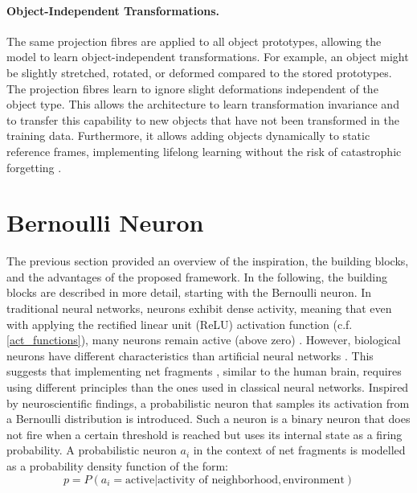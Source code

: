 \paragraph{Object-Independent Transformations.} The same projection fibres are applied to all object prototypes, allowing the model to learn object-independent transformations. For example, an object might be slightly stretched, rotated, or deformed compared to the stored prototypes. The projection fibres learn to ignore slight deformations independent of the object type. This allows the architecture to learn transformation invariance and to transfer this capability to new objects that have not been transformed in the training data.
Furthermore, it allows adding objects dynamically to static reference frames, implementing lifelong learning  without the risk of catastrophic forgetting .

\section{Bernoulli Neuron}
The previous section provided an overview of the inspiration, the building blocks, and the advantages of the proposed framework. In the following, the building blocks are described in more detail, starting with the Bernoulli neuron.
In traditional neural networks, neurons exhibit dense activity, meaning that even with applying the rectified linear unit (ReLU) activation function (c.f. \eqref{act_functions}), many neurons remain active (above zero) . However, biological neurons have different characteristics than artificial neural networks .
This suggests that implementing net fragments , similar to the human brain, requires using different principles than the ones used in classical neural networks. Inspired by neuroscientific findings, a probabilistic neuron that samples its activation from a Bernoulli distribution is introduced.
Such a neuron is a binary neuron that does not fire when a certain threshold is reached but uses its internal state as a firing probability. A probabilistic neuron $a_i$ in the context of net fragments is modelled as a probability density function of the form:
\begin{equation}
    p = P(a_i = \text{active} | \text{activity of neighborhood}, \text{environment}) 
\end{equation}

